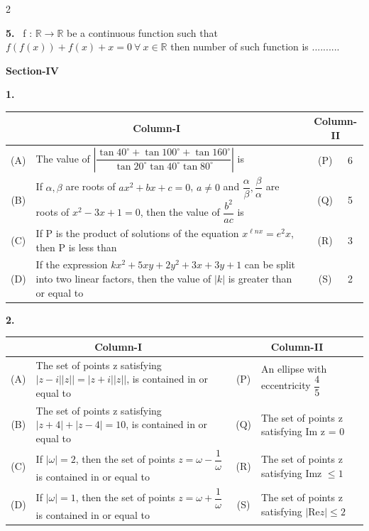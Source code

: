 \documentclass[10pt]{extarticle}
\newcommand{\sect}[1]{\par\smallskip\noindent\textbf{#1}\par}
\newcommand{\qn}[1]{\par\smallskip\noindent\textbf{#1.}~}
\begin{document}
\begin{multicols}{2}
\qn{5} f : $\mathbb R\to\mathbb R$ be a continuous function such that $f(f(x))+f(x)+x=0\ \forall\ x\in\mathbb R$ then number of such function is ..........

\sect{Section-IV}

\qn{1}\par\nobreak
\begin{center}\small\setlength{\tabcolsep}{3pt}
\begin{tabular}{|c|p{4.4cm}|c|p{0.5cm}|}
\hline
\multicolumn{2}{|c|}{Column-I} & \multicolumn{2}{c|}{Column-II} \\
\hline
(A) & The value of $\left|\dfrac{\tan40^\circ+\tan100^\circ+\tan160^\circ}{\tan20^\circ\tan40^\circ\tan80^\circ}\right|$ is & (P) & 6 \\
\hline
(B) & If $\alpha,\beta$ are roots of $ax^2+bx+c=0$, $a\ne0$ and $\dfrac\alpha\beta,\dfrac\beta\alpha$ are roots of $x^2-3x+1=0$, then the value of $\dfrac{b^2}{ac}$ is & (Q) & 5 \\
\hline
(C) & If P is the product of solutions of the equation $x^{\ell nx}=e^2x$, then P is less than & (R) & 3 \\
\hline
(D) & If the expression $kx^2+5xy+2y^2+3x+3y+1$ can be split into two linear factors, then the value of $|k|$ is greater than or equal to & (S) & 2 \\
\hline
\end{tabular}
\end{center}

\qn{2}\par\nobreak
\begin{center}\small\setlength{\tabcolsep}{3pt}
\begin{tabular}{|c|p{3.3cm}|c|p{2.4cm}|}
\hline
\multicolumn{2}{|c|}{Column-I} & \multicolumn{2}{c|}{Column-II} \\
\hline
(A) & The set of points z satisfying $|z-i||z||=|z+i||z||$, is contained in or equal to & (P) & An ellipse with eccentricity $\dfrac45$ \\
\hline
(B) & The set of points z satisfying $|z+4|+|z-4|=10$, is contained in or equal to & (Q) & The set of points z satisfying Im z = 0 \\
\hline
(C) & If $|\omega|=2$, then the set of points $z=\omega-\dfrac1\omega$ is contained in or equal to & (R) & The set of points z satisfying Imz $\le1$ \\
\hline
(D) & If $|\omega|=1$, then the set of points $z=\omega+\dfrac1\omega$ is contained in or equal to & (S) & The set of points z satisfying $|\text{Re}z|\le2$ \\
\hline
\end{tabular}
\end{center}


\end{multicols}
\end{document}
